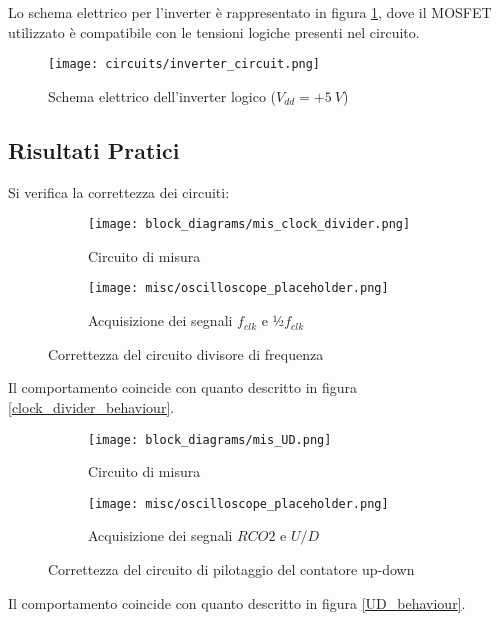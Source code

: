 Lo schema elettrico per l'inverter è rappresentato in figura \ref{inverter_circuit}, dove
il MOSFET utilizzato è compatibile con le tensioni logiche presenti nel circuito.

\begin{figure}[H]
    \centering
    \texttt{[image: circuits/inverter\_circuit.png]}
    \caption{Schema elettrico dell'inverter logico ($V_{dd}=+5\ V$)}
    \label{inverter_circuit}
\end{figure}


\subsection*{Risultati Pratici}


Si verifica la correttezza dei circuiti:

\begin{figure}[H]
    \centering

    \begin{subfigure}{.5\textwidth}
        \centering
        \texttt{[image: block\_diagrams/mis\_clock\_divider.png]}
        \caption{Circuito di misura}
        \label{mis_clock_divider}
    \end{subfigure}%
    \begin{subfigure}{.5\textwidth}
        \centering
        \texttt{[image: misc/oscilloscope\_placeholder.png]}
        \caption{Acquisizione dei segnali $f_{clk}$ e ½$f_{clk}$}
        \label{acq_clock_divider}
    \end{subfigure}

    \caption{Correttezza del circuito divisore di frequenza}
    \label{clock_divider}
\end{figure}

Il comportamento coincide con quanto descritto in figura \ref{clock_divider_behaviour}.

\begin{figure}[H]
    \centering

    \begin{subfigure}{.5\textwidth}
        \centering
        \texttt{[image: block\_diagrams/mis\_UD.png]}
        \caption{Circuito di misura}
        \label{mis_UD}
    \end{subfigure}%
    \begin{subfigure}{.5\textwidth}
        \centering
        \texttt{[image: misc/oscilloscope\_placeholder.png]}
        \caption{Acquisizione dei segnali $RCO2$ e $U/D$}
        \label{acq_UD}
    \end{subfigure}

    \caption{Correttezza del circuito di pilotaggio del contatore up-down}
    \label{UD}
\end{figure}

Il comportamento coincide con quanto descritto in figura \ref{UD_behaviour}.


